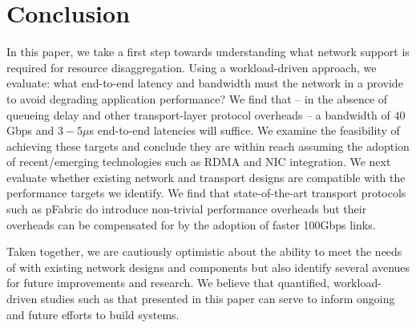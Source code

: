 \section{Conclusion}
In this paper, we take a first step towards understanding what network support is required for resource disaggregation. Using a workload-driven approach, we evaluate: what end-to-end latency and bandwidth must the network in a \dis provide to avoid degrading application performance? We find that -- in the absence of queueing delay and other transport-layer protocol overheads -- a bandwidth of $40$Gbps and $3-5\mu$s end-to-end latencies will suffice. We examine the feasibility of achieving these targets and conclude they are within reach assuming the adoption of recent/emerging technologies such as RDMA and NIC integration. We next evaluate whether existing network and transport designs are compatible with the performance targets we identify. We find that state-of-the-art transport protocols such as pFabric do introduce non-trivial performance overheads but their overheads can be compensated for by the adoption of faster 100Gbps links. 

Taken together, we are cautiously optimistic about the ability to meet the needs of \dis with existing network designs and components but also identify several avenues for future improvements and research. We believe that quantified, workload-driven studies such as that presented in this paper can serve to inform ongoing and future efforts to build \dis systems. 

